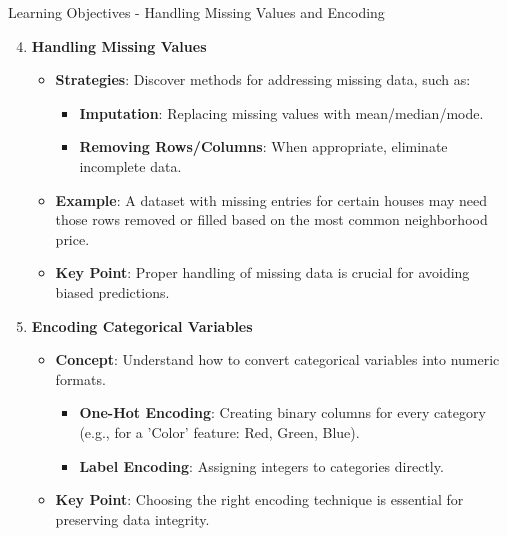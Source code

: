 \documentclass[aspectratio=169]{beamer}
\begin{document}
\begin{frame}[fragile]{Learning Objectives - Handling Missing Values and Encoding}
    \begin{enumerate}
        \setcounter{enumi}{3}
        \item \textbf{Handling Missing Values}
            \begin{itemize}
                \item \textbf{Strategies}: Discover methods for addressing missing data, such as:
                \begin{itemize}
                    \item \textbf{Imputation}: Replacing missing values with mean/median/mode.
                    \item \textbf{Removing Rows/Columns}: When appropriate, eliminate incomplete data.
                \end{itemize}
                \item \textbf{Example}: A dataset with missing entries for certain houses may need those rows removed or filled based on the most common neighborhood price.
                \item \textbf{Key Point}: Proper handling of missing data is crucial for avoiding biased predictions.
            \end{itemize}
        
        \item \textbf{Encoding Categorical Variables}
            \begin{itemize}
                \item \textbf{Concept}: Understand how to convert categorical variables into numeric formats.
                \begin{itemize}
                    \item \textbf{One-Hot Encoding}: Creating binary columns for every category (e.g., for a 'Color' feature: Red, Green, Blue).
                    \item \textbf{Label Encoding}: Assigning integers to categories directly.
                \end{itemize}
                \item \textbf{Key Point}: Choosing the right encoding technique is essential for preserving data integrity.
            \end{itemize}
    \end{enumerate}
\end{frame}
\end{document}
